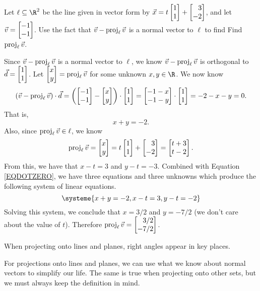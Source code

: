 \begin{example}
	Let $\ell\subseteq \R^2$ be the line given in vector form by $\vec x=t\mat{1\\1}+\mat{3\\-2}$,
	and let $\vec v=\mat{-1\\-1}$. Use the fact that $\vec v-\operatorname{proj}_\ell\vec v$ is a normal vector to $\ell$
	to find Find $\operatorname{proj}_\ell \vec v$.

	Since $\vec v-\operatorname{proj}_\ell\vec v$ is a normal vector to $\ell$, we know $\vec v-\operatorname{proj}_\ell\vec v$ is orthogonal to $\vec d=\mat{1\\1}$. 
	Let $\mat{x\\y}=\Proj_\ell\vec v$ for some unknown $x,y\in\R$. We now know
	\[
		(\vec v-\Proj_\ell\vec v)\cdot\vec d=\left(\mat{-1\\-1}-\mat{x\\y}\right)\cdot\mat{1\\1}
		=\mat{-1-x\\-1-y}\cdot \mat{1\\1}=-2-x-y=0.
	\]
	That is, 
	\begin{equation}
	\label{EQDOTZERO}
	    x+y=-2.
	\end{equation}
	Also, since $\operatorname{proj}_\ell\vec v\in\ell$, we know
	\[
    		\Proj_\ell\vec v = \mat{x\\y}=t\mat{1\\1}+\mat{3\\-2}=\mat{t+3\\t-2}.
	\]
	From this, we have that $x-t=3$ and $y-t=-3$. Combined with Equation \eqref{EQDOTZERO}, we have
	three equations and three unknowns which produce the following system of linear equations.
	\[
		\systeme{x+y=-2,x-t=3,y-t=-2}
	\]
	Solving this system, we conclude that $x=3/2$ and $y=-7/2$ (we don't care about the value of $t$). Therefore
	 $\Proj_\ell\vec v = \mat{3/2\\-7/2}$. 
\end{example}

\begin{emphbox}[Takeaway]
	When projecting onto lines and planes, right angles appear in key places.
\end{emphbox}

For projections onto lines and planes, we can use what we know about normal vectors to simplify our life.
The same is true when projecting onto other sets, but we must always keep the definition in mind.

